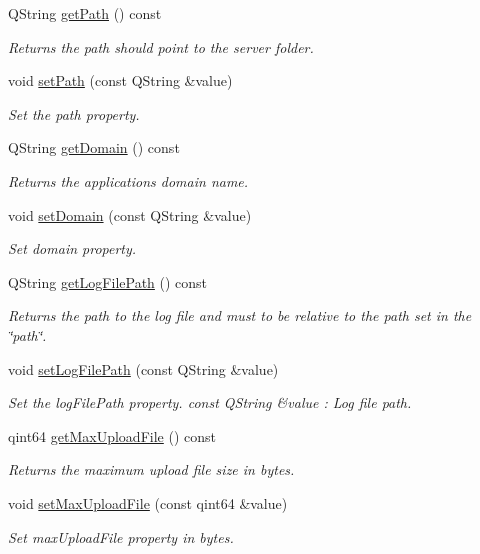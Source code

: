 \begin{DoxyCompactItemize}
Q\+String \hyperlink{class_c_w_f_1_1_configuration_ab06608c19c21328164decd638184e1d7}{get\+Path} () const 
\begin{DoxyCompactList}\small\item\em Returns the path should point to the server folder. \end{DoxyCompactList}\item 
void \hyperlink{class_c_w_f_1_1_configuration_ac41976f9d3fb9232a91f81f1eb683b89}{set\+Path} (const Q\+String \&value)
\begin{DoxyCompactList}\small\item\em Set the path property. \end{DoxyCompactList}\item 
Q\+String \hyperlink{class_c_w_f_1_1_configuration_ad49757d6459a0082b6330eaf3e3915e7}{get\+Domain} () const 
\begin{DoxyCompactList}\small\item\em Returns the applications domain name. \end{DoxyCompactList}\item 
void \hyperlink{class_c_w_f_1_1_configuration_a6aea4b5ebe457e8a9f29d4c81912dd62}{set\+Domain} (const Q\+String \&value)
\begin{DoxyCompactList}\small\item\em Set domain property. \end{DoxyCompactList}\item 
Q\+String \hyperlink{class_c_w_f_1_1_configuration_a5b9a98b8265c26b158a220ae5bdc13c6}{get\+Log\+File\+Path} () const 
\begin{DoxyCompactList}\small\item\em Returns the path to the log file and must to be relative to the path set in the \char`\"{}path\char`\"{}. \end{DoxyCompactList}\item 
void \hyperlink{class_c_w_f_1_1_configuration_a66344b5f402647dd7894295c1699afdf}{set\+Log\+File\+Path} (const Q\+String \&value)
\begin{DoxyCompactList}\small\item\em Set the log\+File\+Path property. const Q\+String \&value \+: Log file path. \end{DoxyCompactList}\item 
qint64 \hyperlink{class_c_w_f_1_1_configuration_ab984199080d67569ee9a75b7bab3d546}{get\+Max\+Upload\+File} () const 
\begin{DoxyCompactList}\small\item\em Returns the maximum upload file size in bytes. \end{DoxyCompactList}\item 
void \hyperlink{class_c_w_f_1_1_configuration_a5426d15635fb22763e0d7807de49923c}{set\+Max\+Upload\+File} (const qint64 \&value)
\begin{DoxyCompactList}\small\item\em Set max\+Upload\+File property in bytes. \end{DoxyCompactList}\end{DoxyCompactItemize}
